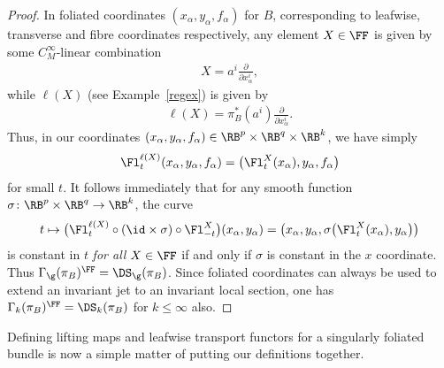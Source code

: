 \begin{proof}
In foliated coordinates $(x_{\alpha},y_{\alpha},f_{\alpha})$ for $B$, corresponding to leafwise, transverse and fibre coordinates respectively, any element $X\in\FF$ is given by some $C^{\infty}_{M}$-linear combination
\begin{gather*}
X = a^{i}\frac{\partial}{\partial x_{\alpha}^{i}},
\end{gather*}
while $\ell(X)$ (see Example~\ref{regex}) is given by
\begin{gather*}
\ell(X) = \pi_{B}^{*}(a^{i})\frac{\partial}{\partial x_{\alpha}^{i}}.
\end{gather*}
Thus, in our coordinates $(x_{\alpha},y_{\alpha},f_{\alpha})\in\RB^{p}\times\RB^{q}\times\RB^{k}$, we have simply
\begin{gather*}
\Fl^{\ell(X)}_{t}(x_{\alpha},y_{\alpha},f_{\alpha}) = \big(\Fl^{X}_{t}(x_{\alpha}),y_{\alpha},f_{\alpha}\big)
\end{gather*}
for small $t$. It follows immediately that for any smooth function $\sigma\colon \RB^{p}\times\RB^{q}\rightarrow\RB^{k}$, the curve
\begin{gather*}
t\mapsto\big(\Fl^{\ell(X)}_{t}\circ(\id\times\sigma)\circ\Fl^{X}_{-t}\big)(x_{\alpha},y_{\alpha}) = \big(x_{\alpha},y_{\alpha},\sigma\big(\Fl^{X}_{t}(x_{\alpha}),y_{\alpha}\big)\big)
\end{gather*}
is constant in $t$ \textit{for all $X\in\FF$} if and only if $\sigma$ is constant in the $x$ coordinate. Thus $\Gamma_{\g}(\pi_{B})^{\FF} = \DS_{\g}(\pi_{B})$. Since foliated coordinates can always be used to extend an invariant jet to an invariant local section, one has $\Gamma_{k}(\pi_{B})^{\FF} = \DS_{k}(\pi_{B})$ for $k\leq\infty$ also.
\end{proof}

Defining lifting maps and leafwise transport functors for a singularly foliated bundle is now a simple matter of putting our definitions together.

